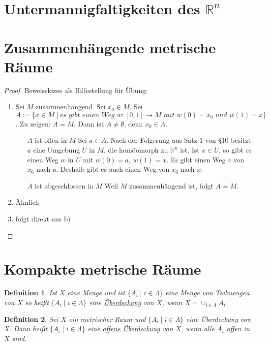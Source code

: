 \documentclass[10pt,a4paper]{report}
\newtheorem*{defi}{Definition}
\begin{document}
\section{Untermannigfaltigkeiten des $\mathbb{R}^{n}$}

\section{Zusammenhängende metrische Räume}

\begin{proof}
  Beweisskizee als Hilfestellung für Übung:
  \begin{enumerate}[label={\alph*)}]
  \item Sei $M$ zusammenhängend.
    Sei $x_{0} \in M$.
    Sei $A := \{ x \in M \mid \textit{es gibt einen Weg $w : [0, 1] \rightarrow M$ mit $w(0) = x_0$ und $w(1) = x$} \}$.
    Zu zeigen: $A = M$.
    Dann ist $A \ne \emptyset$, denn $x_{0} \in A$.
    \begin{enumerate}
    \item[$A$ ist offen in $M$] Sei $a \in A$.
      Nach der Folgerung aus Satz 1 von §10 besitzt $a$ eine Umgebung $U$ in $M$, die homöomorph zu $\mathbb{R}^{n}$ ist.
      Ist $x \in U$, so gibt es einen Weg $w$ in $U$ mit $w(0) = a$, $w(1) = x$.
      Es gibt einen Weg $v$ von $x_{0}$ nach $a$.
      Deshalb gibt es auch einen Weg von $x_{0}$ nach $x$.
      \item[$A$ ist abgeschlossen in $M$] Weil $M$ zusammenhängend ist, folgt $A = M$.
    \end{enumerate}
  \item Ähnlich
  \item folgt direkt aus b)
  \end{enumerate}
\end{proof}

\section{Kompakte metrische Räume}

\begin{defi}
  Ist $X$ eine Menge und ist $\{ A_{i} \mid i \in \Lambda \}$ eine Menge von Teilmengen von $X$ so heißt $\{ A_{i} \mid i \in \Lambda \}$ eine \underline{Überdeckung} von $X$, wenn $X = \cup_{i \in \Lambda} A_{i}$.
\end{defi}

\begin{defi}
  Sei $X$ ein metrischer Raum und $\{ A_{i} \mid i \in \Lambda \}$ eine Überdeckung von X.
  Dann heißt $\{ A_{i} \mid i \in \Lambda \}$ eine \underline{offene Überdeckung} von $X$, wenn alle $A_{i}$ offen in $X$ sind.
\end{defi}
\end{document}
